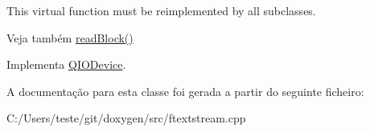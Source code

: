 This virtual function must be reimplemented by all subclasses.

\begin{DoxySeeAlso}{Veja também}
\hyperlink{class_q_g_string_buffer_a5b9fb6a6e465fb192ae8a94cfa4341f3}{read\-Block()} 
\end{DoxySeeAlso}


Implementa \hyperlink{class_q_i_o_device_a90a5a6111eca9a444970cf49aea9f9a8}{Q\-I\-O\-Device}.



A documentação para esta classe foi gerada a partir do seguinte ficheiro\-:\begin{DoxyCompactItemize}
\item 
C\-:/\-Users/teste/git/doxygen/src/ftextstream.\-cpp\end{DoxyCompactItemize}

